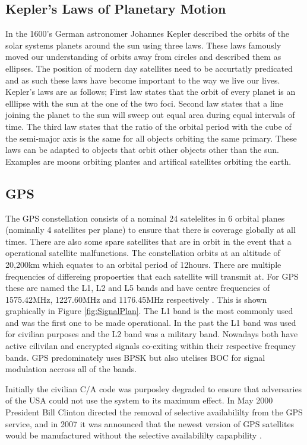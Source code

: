 \subsection{Kepler's Laws of Planetary Motion} \label{subsec: OrbitalMechanics}
In the 1600's German astronomer Johannes Kepler described the orbits of the solar systems planets around the sun using three laws. 
These laws famously moved our understanding of orbits away from circles and described them as ellipses. The position of modern day satellites need to be accurtatly
predicated and as such these laws have become important to the way we live our lives. Kepler's laws are as follows; First law states that the orbit of every planet is an
elllipse with the sun at the one of the two foci. Second law states that a line joining the planet to the sun will sweep out equal area during equal intervals of time.
The third law states that the ratio of the orbital period with the cube of the semi-major axis is the same for all objects orbiting the same primary. These laws can be
adapted to objects that orbit other objects other than the sun. Examples are moons orbiting plantes and artifical satellites orbiting the earth.

\subsection{GPS} \label{subsec:GNSS_GPSIntro}
The GPS constellation consists of a nominal 24 satelelites in 6 orbital planes (nominally 4 satellites per plane) to ensure that there is coverage globally at all times.
There are also some spare satellites that are in orbit in the event that a operational satellite malfunctions. The constellation orbits at an altitude of 20,200km which
equates to an orbital period of 12hours. There are multiple frequencies of differeing propoerties that each satellite will transmit at. For GPS these are named the L1, L2
and L5 bands and have centre frequencies of 1575.42MHz, 1227.60MHz and 1176.45MHz respectively \cite{RN49}. This is shown graphically in Figure \ref{fig:SignalPlan}. The
L1 band is the most commonly used and was the first one to be made operational. In the past the L1 band was used for civilian purposes and the L2 band was a military
band. Nowadays both have active cilivilan and encrypted signals co-exiting within their respective frequncy bands. GPS predominately uses BPSK but also utelises BOC for
signal modulation accross all of the bands.  

Initially the civilian C/A code was purposley degraded to ensure that adversaries of the USA could not use the system to its maximum effect. In May 2000 President Bill
Clinton directed the removal of selective availabililty from the GPS service, and in 2007 it was announced that the newest version of GPS satellites would be manufactured
without the selective availabililty capapbility \cite{RN62} \cite{RN64}.

